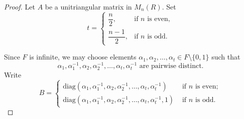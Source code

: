 \documentclass{amsart}
\theoremstyle{definition}
\begin{document}
\begin{proof}
	Let $A$ be a unitriangular matrix in $M_n(R)$.
	Set
	\[
	t=\begin{cases}
		\dfrac{n}{2}, & \text{if $n$ is even},\\[0.3em]
		\dfrac{n-1}{2}, & \text{if $n$ is odd}.
	\end{cases}
	\]
	
	Since $F$ is infinite, we may choose elements
	$\alpha_1,\alpha_2,\ldots,\alpha_t \in F \setminus \{ 0, 1 \}$ such that 
    \[  \alpha_1,\alpha_1^{-1},\alpha_2,\alpha_2^{-1},\ldots,\alpha_t,\alpha_t^{-1} \text{ are pairwise distinct}.
    \]
	Write $$B=\begin{cases} \mathrm{diag}(\alpha_1,\alpha_1^{-1},\alpha_2,\alpha_2^{-1},\ldots,\alpha_t,\alpha_t^{-1}) & \text{ if $n$ is even};\\ \mathrm{diag}(\alpha_1,\alpha_1^{-1},\alpha_2,\alpha_2^{-1},\ldots,\alpha_t,\alpha_t^{-1},1) & \text{ if $n$ is odd}. \end{cases}$$
	

\end{proof}
\end{document}
